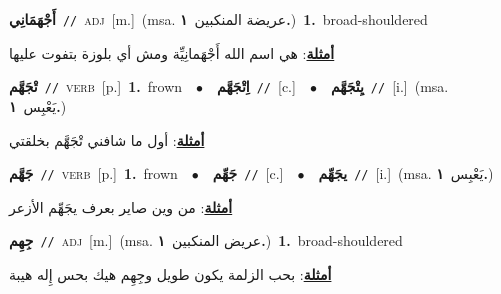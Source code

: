 \documentclass[10pt,a4paper,twoside]{article} %
\begin{document}
\begin{multicols}{2}
{\setlength\topsep{0pt}\textbf{\foreignlanguage{arabic}{أَجْهَمَانِي}}\ {\color{gray}\texttt{//}\color{black}}\ \textsc{adj}\ [m.]\ \color{gray}(msa. \foreignlanguage{arabic}{عريضة المنكبين}~\foreignlanguage{arabic}{\textbf{١.}})\color{black}\ \textbf{1.}~broad-shouldered\  \begin{flushright}\color{gray}\foreignlanguage{arabic}{\textbf{\underline{\foreignlanguage{arabic}{أمثلة}}}: هي اسم الله أَجْهَمانِيِّة ومش أي بلوزة بتفوت عليها}\end{flushright}\color{black}} \vspace{2mm}

{\setlength\topsep{0pt}\textbf{\foreignlanguage{arabic}{تْجَهَّم}}\ {\color{gray}\texttt{//}\color{black}}\ \textsc{verb}\ [p.]\ \textbf{1.}~frown\ \ $\bullet$\ \ \setlength\topsep{0pt}\textbf{\foreignlanguage{arabic}{اِتْجَهَّم}}\ {\color{gray}\texttt{//}\color{black}}\ [c.]\ \ $\bullet$\ \ \setlength\topsep{0pt}\textbf{\foreignlanguage{arabic}{يِتْجَهَّم}}\ {\color{gray}\texttt{//}\color{black}}\ [i.]\ \color{gray}(msa. \foreignlanguage{arabic}{يَعْبِس}~\foreignlanguage{arabic}{\textbf{١.}})\color{black}\  \begin{flushright}\color{gray}\foreignlanguage{arabic}{\textbf{\underline{\foreignlanguage{arabic}{أمثلة}}}: أول ما شافني تْجَهَّم بخلقتي}\end{flushright}\color{black}} \vspace{2mm}

{\setlength\topsep{0pt}\textbf{\foreignlanguage{arabic}{جَهَّم}}\ {\color{gray}\texttt{//}\color{black}}\ \textsc{verb}\ [p.]\ \textbf{1.}~frown\ \ $\bullet$\ \ \setlength\topsep{0pt}\textbf{\foreignlanguage{arabic}{جَهِّم}}\ {\color{gray}\texttt{//}\color{black}}\ [c.]\ \ $\bullet$\ \ \setlength\topsep{0pt}\textbf{\foreignlanguage{arabic}{يجَهِّم}}\ {\color{gray}\texttt{//}\color{black}}\ [i.]\ \color{gray}(msa. \foreignlanguage{arabic}{يَعْبِس}~\foreignlanguage{arabic}{\textbf{١.}})\color{black}\  \begin{flushright}\color{gray}\foreignlanguage{arabic}{\textbf{\underline{\foreignlanguage{arabic}{أمثلة}}}: من وين صاير بعرف يجَهِّم الأزعر}\end{flushright}\color{black}} \vspace{2mm}

{\setlength\topsep{0pt}\textbf{\foreignlanguage{arabic}{جِهِم}}\ {\color{gray}\texttt{//}\color{black}}\ \textsc{adj}\ [m.]\ \color{gray}(msa. \foreignlanguage{arabic}{عريض المنكبين}~\foreignlanguage{arabic}{\textbf{١.}})\color{black}\ \textbf{1.}~broad-shouldered\  \begin{flushright}\color{gray}\foreignlanguage{arabic}{\textbf{\underline{\foreignlanguage{arabic}{أمثلة}}}: بحب الزلمة يكون طويل وجِهِم هيك بحس إِله هيبة}\end{flushright}\color{black}} \vspace{2mm}


\end{multicols}
\end{document}
